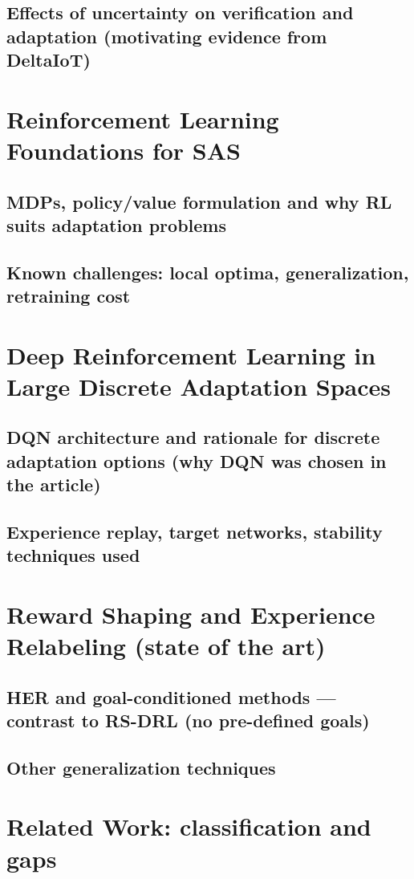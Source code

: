 \documentclass[11pt,a4paper]{article}
\begin{document}
\subsection{Effects of uncertainty on verification and adaptation (motivating evidence from DeltaIoT)}

\section{Reinforcement Learning Foundations for SAS}
\subsection{MDPs, policy/value formulation and why RL suits adaptation problems}
\subsection{Known challenges: local optima, generalization, retraining cost}

\section{Deep Reinforcement Learning in Large Discrete Adaptation Spaces}
\subsection{DQN architecture and rationale for discrete adaptation options (why DQN was chosen in the article)}
\subsection{Experience replay, target networks, stability techniques used}

\section{Reward Shaping and Experience Relabeling (state of the art)}
\subsection{HER and goal-conditioned methods --- contrast to RS-DRL (no pre-defined goals)}
\subsection{Other generalization techniques}

\section{Related Work: classification and gaps}
\end{document}
